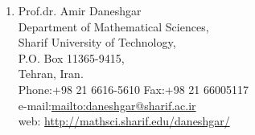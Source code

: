 \documentclass[a4paper]{article}
\begin{document}
\begin{enumerate}
\item Prof.dr. Amir Daneshgar\\
Department of Mathematical Sciences,\\
Sharif University of Technology,\\
P.O. Box 11365-9415,\\
Tehran, Iran.\\
Phone:+98 21 6616-5610 \hspace*{1cm}    Fax:+98 21 66005117 \\
e-mail:\url{mailto:daneshgar@sharif.ac.ir}\\
web: \url{http://mathsci.sharif.edu/daneshgar/}

\end{enumerate}
\end{document}
